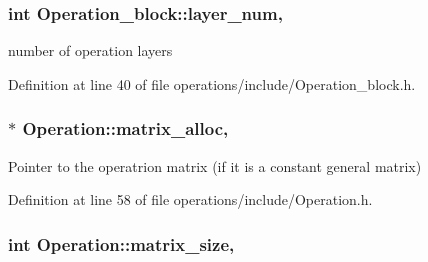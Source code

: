 \subsubsection[{\texorpdfstring{layer\+\_\+num}{layer_num}}]{\setlength{\rightskip}{0pt plus 5cm}int Operation\+\_\+block\+::layer\+\_\+num\hspace{0.3cm}{\ttfamily [protected]}, {\ttfamily [inherited]}}\hypertarget{class_operation__block_a907101b9a80e6ebeaa96cc7b973cf413}{}\label{class_operation__block_a907101b9a80e6ebeaa96cc7b973cf413}


number of operation layers 



Definition at line 40 of file operations/include/\+Operation\+\_\+block.\+h.

\subsubsection[{\texorpdfstring{matrix\+\_\+alloc}{matrix_alloc}}]{ $\ast$ Operation\+::matrix\+\_\+alloc\hspace{0.3cm}{\ttfamily [protected]}, {\ttfamily [inherited]}}\hypertarget{class_operation_ade4d28d271ca13950d04363aac1c382e}{}\label{class_operation_ade4d28d271ca13950d04363aac1c382e}


Pointer to the operatrion matrix (if it is a constant general matrix) 



Definition at line 58 of file operations/include/\+Operation.\+h.

\subsubsection[{\texorpdfstring{matrix\+\_\+size}{matrix_size}}]{\setlength{\rightskip}{0pt plus 5cm}int Operation\+::matrix\+\_\+size\hspace{0.3cm}{\ttfamily [protected]}, {\ttfamily [inherited]}}\hypertarget{class_operation_a8236c07112cb165a00d3869363808624}{}\label{class_operation_a8236c07112cb165a00d3869363808624}



